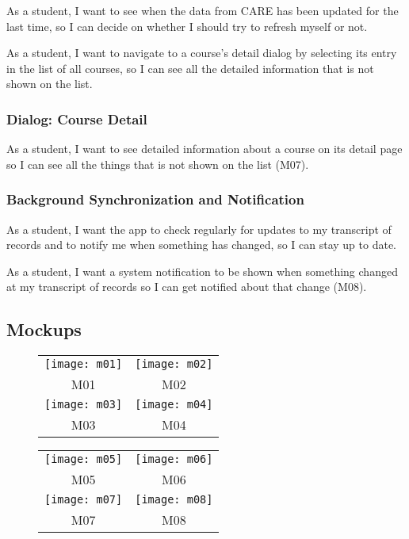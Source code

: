As a student, I want to see when the data from CARE has been updated for the last time, so I can decide on whether I should try to refresh myself or not.

As a student, I want to navigate to a course's detail dialog by selecting its entry in the list of all courses, so I can see all the detailed information that is not shown on the list.

\subsubsection*{Dialog: Course Detail}

As a student, I want to see detailed information about a course on its detail page so I can see all the things that is not shown on the list (M07).

\subsubsection*{Background Synchronization and Notification}

As a student, I want the app to check regularly for updates to my transcript of records and to notify me when something has changed, so I can stay up to date.

As a student, I want a system notification to be shown when something changed at my transcript of records so I can get notified about that change (M08).

\subsection*{Mockups}

\begin{figure}[H]
\center
\begin{tabular}{c@{\hskip 1in}c}
\texttt{[image: m01]} & \texttt{[image: m02]} \\
M01 & M02 \\[25pt]
\texttt{[image: m03]} &  \texttt{[image: m04]} \\
M03 & M04 \\
\end{tabular}
\end{figure}
\vfill

\begin{figure}[H]
\center
\begin{tabular}{c@{\hskip 1in}c}
\texttt{[image: m05]} & \texttt{[image: m06]} \\
M05 & M06 \\[25pt]
\texttt{[image: m07]} &  \texttt{[image: m08]} \\
M07 & M08 \\
\end{tabular}
\end{figure}


